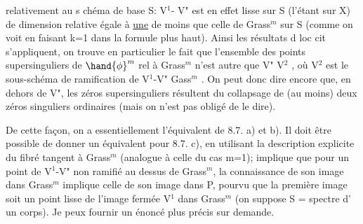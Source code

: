 
relativement  au s chéma de base S:  V$^1$- V"  est en effet lisse sur S
(l'étant sur X)  de dimension relative égale à \uline{une} de moins que celle de
Grass$^m$ sur S  (comme on voit en faisant k=1 dans la formule plus haut).
Ainsi  les résultats d  loc cit  s'appliquent, on trouve en particulier
le fait que l'ensemble des points  supersinguliers  de $\hand{\phi}^m$ rel à Grass$^m$
n'est autre que V" \hand{$\cup$} V$^2$ , où  V$^2$ est le sous-schéma de ramification
de  V$^1$-V" \hand{$\longrightarrow$} Gass$^m$ .  On peut donc dire encore que, en dehors de V", les
zéros supersinguliers résultent du collapsage de (au moins) deux zéros
singuliers ordinaires (mais on  n'est pas obligé de le dire\hand{)}).

 De cette façon, on a essentiellement l'équivalent de 8.7. a) et b). Il 
doit être possible de donner un équivalent pour  8.7. c), en  utilisant
la  description explicite du fibré tangent  à Grass$^m$ (analogue à
celle du cas m=1);   implique  que  pour  un point  de  V$^1$-V"  non
ramifié au dessus  de Grass$^m$, la connaissance de son image dans Grass$^m$
implique celle de son image dans P, pourvu que la première image soit un
point lisse de l'image fermée  V$^1$ dans Grass$^m$  (on suppose S = spectre d'
un corps).  Je peux fournir un énoncé  plus précis sur demande.

